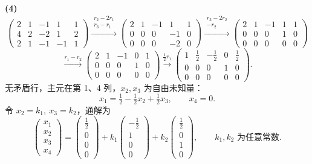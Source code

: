 \documentclass[11pt,a4paper]{ctexart}
\newcommand{\rt}[1]{\xrightarrow{#1}}
\begin{document}
\textbf{(4)}
\[
\left(\begin{array}{cccc|c}2&1&-1&1&1\\4&2&-2&1&2\\2&1&-1&-1&1\end{array}\right)
\rt{\substack{r_2-2r_1\\ r_3-r_1}}
\left(\begin{array}{cccc|c}2&1&-1&1&1\\0&0&0&-1&0\\0&0&0&-2&0\end{array}\right)
\rt{\substack{r_3-2r_2\\ -r_2}}
\left(\begin{array}{cccc|c}2&1&-1&1&1\\0&0&0&1&0\\0&0&0&0&0\end{array}\right)
\]
\[
\rt{r_1-r_2}
\left(\begin{array}{cccc|c}2&1&-1&0&1\\0&0&0&1&0\\0&0&0&0&0\end{array}\right)
\rt{\frac12 r_1}
\left(\begin{array}{cccc|c}1&\frac12&-\frac12&0&\frac12\\0&0&0&1&0\\0&0&0&0&0\end{array}\right).
\]
无矛盾行，主元在第 1、4 列，$x_2,x_3$ 为自由未知量：
\[
x_1=\tfrac12-\tfrac12x_2+\tfrac12x_3,\qquad x_4=0.
\]
令 $x_2=k_1,\ x_3=k_2$，通解为
\[
\begin{pmatrix}x_1\\x_2\\x_3\\x_4\end{pmatrix}
=\begin{pmatrix}\frac12\\0\\0\\0\end{pmatrix}
+k_1\begin{pmatrix}-\frac12\\1\\0\\0\end{pmatrix}
+k_2\begin{pmatrix}\frac12\\0\\1\\0\end{pmatrix},
\qquad k_1,k_2\text{ 为任意常数}.
\]
\end{document}
